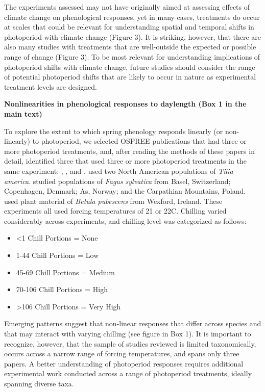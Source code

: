 \documentclass{article}
\begin{document}
\par The experiments assessed may not have originally aimed at assessing effects of climate change on phenological responses, yet in many cases, treatments do occur at scales that could be relevant for understanding spatial and temporal shifts in photoperiod with climate change (Figure 3). It is striking, however, that there are also many studies with treatments that are well-outside the expected or possible range of change (Figure 3).  To be most relevant for understanding implications of photoperiod shifts with climate change, future studies should consider the range of potential photoperiod shifts that are likely to occur in nature as experimental treatment levels are designed.

\par \textbf{Nonlinearities in phenological responses to daylength (Box 1 in the main text)}
\par To explore the extent to which spring phenology responds linearly (or non-linearly) to photoperiod, we selected OSPREE publications that had three or more photoperiod treatments, and, after reading the methods of these papers in detail, identified three that used three or more photoperiod treatments in the same experiment: \citet{Ashby:1962aa}, \citet{Heide:1993a}, and \citet{Caffarra:2011b}. \citet{Ashby:1962aa} used two North American populations of \textit{Tilia america}. \citet{Heide:1993a} studied populations of \textit{Fagus sylvatica} from Basel, Switzerland; Copenhagen, Denmark; As, Norway; and the Carpathian Mountains, Poland. \citet{Caffarra:2011b} used plant material of \textit{Betula pubescens} from Wexford, Ireland. These experiments all used forcing temperatures of 21 or 22\degree C. Chilling varied considerably across experiments, and chilling level was categorized as follows:
\begin{itemize}
\item <1 Chill Portions = None
\item 1-44 Chill Portions = Low
\item 45-69 Chill Portions = Medium 
\item 70-106 Chill Portions = High
\item >106 Chill Portions = Very High
\end{itemize}

\par Emerging patterns suggest that non-linear responses that differ across species and that may interact with varying chilling (see figure in Box 1). It is important to recognize, however, that the sample of studies reviewed is limited taxonomically, occurs across a narrow range of forcing temperatures, and spans only three papers. A better understanding of photoperiod responses requires additional experimental work conducted across a range of photoperiod treatments, ideally spanning diverse taxa.
\end{document}
